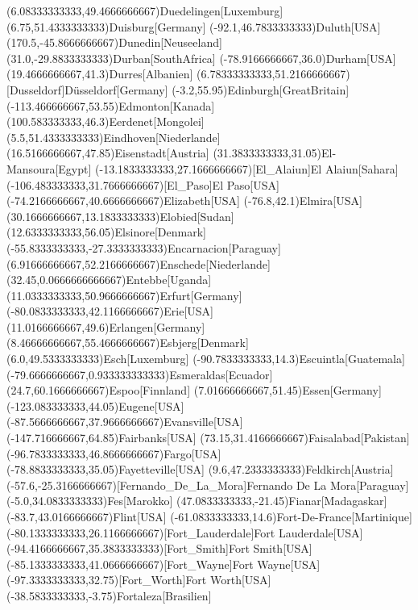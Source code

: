\mapput(6.08333333333,49.4666666667){Duedelingen}[Luxemburg]
\mapput(6.75,51.4333333333){Duisburg}[Germany]
\mapput(-92.1,46.7833333333){Duluth}[USA]
\mapput(170.5,-45.8666666667){Dunedin}[Neuseeland]
\mapput(31.0,-29.8833333333){Durban}[SouthAfrica]
\mapput(-78.9166666667,36.0){Durham}[USA]
\mapput(19.4666666667,41.3){Durres}[Albanien]
\mapput(6.78333333333,51.2166666667)[Dusseldorf]{Düsseldorf}[Germany]
\mapput(-3.2,55.95){Edinburgh}[GreatBritain]
\mapput(-113.466666667,53.55){Edmonton}[Kanada]
\mapput(100.583333333,46.3){Eerdenet}[Mongolei]
\mapput(5.5,51.4333333333){Eindhoven}[Niederlande]
\mapput(16.5166666667,47.85){Eisenstadt}[Austria]
\mapput(31.3833333333,31.05){El-Mansoura}[Egypt]
\mapput(-13.1833333333,27.1666666667)[El_Alaiun]{El Alaiun}[Sahara]
\mapput(-106.483333333,31.7666666667)[El_Paso]{El Paso}[USA]
\mapput(-74.2166666667,40.6666666667){Elizabeth}[USA]
\mapput(-76.8,42.1){Elmira}[USA]
\mapput(30.1666666667,13.1833333333){Elobied}[Sudan]
\mapput(12.6333333333,56.05){Elsinore}[Denmark]
\mapput(-55.8333333333,-27.3333333333){Encarnacion}[Paraguay]
\mapput(6.91666666667,52.2166666667){Enschede}[Niederlande]
\mapput(32.45,0.0666666666667){Entebbe}[Uganda]
\mapput(11.0333333333,50.9666666667){Erfurt}[Germany]
\mapput(-80.0833333333,42.1166666667){Erie}[USA]
\mapput(11.0166666667,49.6){Erlangen}[Germany]
\mapput(8.46666666667,55.4666666667){Esbjerg}[Denmark]
\mapput(6.0,49.5333333333){Esch}[Luxemburg]
\mapput(-90.7833333333,14.3){Escuintla}[Guatemala]
\mapput(-79.6666666667,0.933333333333){Esmeraldas}[Ecuador]
\mapput(24.7,60.1666666667){Espoo}[Finnland]
\mapput(7.01666666667,51.45){Essen}[Germany]
\mapput(-123.083333333,44.05){Eugene}[USA]
\mapput(-87.5666666667,37.9666666667){Evansville}[USA]
\mapput(-147.716666667,64.85){Fairbanks}[USA]
\mapput(73.15,31.4166666667){Faisalabad}[Pakistan]
\mapput(-96.7833333333,46.8666666667){Fargo}[USA]
\mapput(-78.8833333333,35.05){Fayetteville}[USA]
\mapput(9.6,47.2333333333){Feldkirch}[Austria]
\mapput(-57.6,-25.3166666667)[Fernando_De_La_Mora]{Fernando De La Mora}[Paraguay]
\mapput(-5.0,34.0833333333){Fes}[Marokko]
\mapput(47.0833333333,-21.45){Fianar}[Madagaskar]
\mapput(-83.7,43.0166666667){Flint}[USA]
\mapput(-61.0833333333,14.6){Fort-De-France}[Martinique]
\mapput(-80.1333333333,26.1166666667)[Fort_Lauderdale]{Fort Lauderdale}[USA]
\mapput(-94.4166666667,35.3833333333)[Fort_Smith]{Fort Smith}[USA]
\mapput(-85.1333333333,41.0666666667)[Fort_Wayne]{Fort Wayne}[USA]
\mapput(-97.3333333333,32.75)[Fort_Worth]{Fort Worth}[USA]
\mapput(-38.5833333333,-3.75){Fortaleza}[Brasilien]
